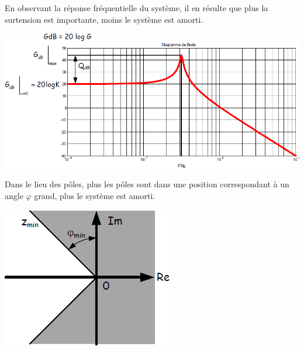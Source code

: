\documentclass[10pt,fleqn]{article} %
\begin{document}
\noindent\begin{minipage}[c]{.55\linewidth}
\begin{resultat}
En observant la réponse fréquentielle du système, il en résulte que plus la surtension est importante, moins le système est amorti.
\end{resultat}
\end{minipage} \hfill
\begin{minipage}[c]{.4\linewidth}
\begin{center}
\includegraphics[width=\linewidth]{images/surtension}
\end{center}
\end{minipage}

\noindent\begin{minipage}[c]{.75\linewidth}
\begin{resultat}
Dans le lieu des pôles, plus les pôles sont dans une position correspondant à un angle $\varphi$ grand, plus le système est amorti.
\end{resultat}
\end{minipage} \hfill
\begin{minipage}[c]{.2\linewidth}
\begin{center}
\includegraphics[width=\linewidth]{images/poles}
\end{center}
\end{minipage}
\end{document}
